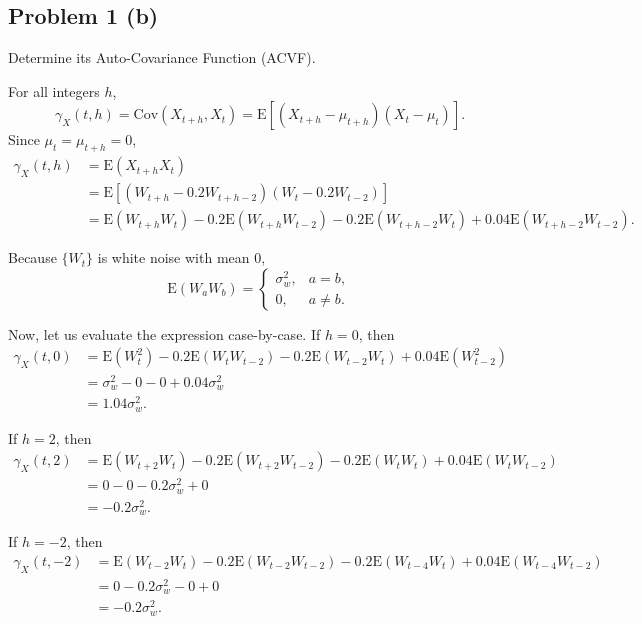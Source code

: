 \documentclass[
  10pt,
]{extarticle}
\begin{document}
\newpage

\subsection{Problem 1 (b)}\label{problem-1-b}

\begin{problem}[Problem 1 (b)]
Determine its Auto-Covariance Function (ACVF).
\end{problem}

For all integers \(h\),
\[
\gamma_X(t,h) = \mathrm{Cov}(X_{t+h},X_t) = \mathrm{E}[(X_{t+h}-\mu_{t+h})(X_t-\mu_t)].
\]
Since \(\mu_t = \mu_{t+h} = 0\),
\[
\begin{aligned}
\gamma_X(t,h)
&= \mathrm{E}(X_{t+h}X_t) \\
&= \mathrm{E}[(W_{t+h} - 0.2W_{t+h-2})(W_t - 0.2W_{t-2})] \\
&= \mathrm{E}(W_{t+h}W_t)
   - 0.2\mathrm{E}(W_{t+h}W_{t-2})
   - 0.2\mathrm{E}(W_{t+h-2}W_t)
   + 0.04\mathrm{E}(W_{t+h-2}W_{t-2}).
\end{aligned}
\]

Because \(\{W_t\}\) is white noise with mean \(0\),
\[
\mathrm{E}(W_aW_b) =
\begin{cases}
\sigma_w^2, & a=b,\\
0, & a \neq b.
\end{cases}
\]

Now, let us evaluate the expression case-by-case. If \(h=0\), then
\[
\begin{aligned}
\gamma_X(t,0)
&= \mathrm{E}(W_t^2)
   - 0.2\mathrm{E}(W_tW_{t-2})
   - 0.2\mathrm{E}(W_{t-2}W_t)
   + 0.04\mathrm{E}(W_{t-2}^2) \\
&= \sigma_w^2 - 0 - 0 + 0.04\sigma_w^2 \\
&= 1.04\sigma_w^2.
\end{aligned}
\]

If \(h=2\), then
\[
\begin{aligned}
\gamma_X(t,2)
&= \mathrm{E}(W_{t+2}W_t)
   - 0.2\mathrm{E}(W_{t+2}W_{t-2})
   - 0.2\mathrm{E}(W_tW_t)
   + 0.04\mathrm{E}(W_tW_{t-2}) \\
&= 0 - 0 - 0.2\sigma_w^2 + 0 \\
&= -0.2\sigma_w^2.
\end{aligned}
\]

If \(h=-2\), then
\[
\begin{aligned}
\gamma_X(t,-2)
&= \mathrm{E}(W_{t-2}W_t)
   - 0.2\mathrm{E}(W_{t-2}W_{t-2})
   - 0.2\mathrm{E}(W_{t-4}W_t)
   + 0.04\mathrm{E}(W_{t-4}W_{t-2}) \\
&= 0 - 0.2\sigma_w^2 - 0 + 0 \\
&= -0.2\sigma_w^2.
\end{aligned}
\]
\end{document}
